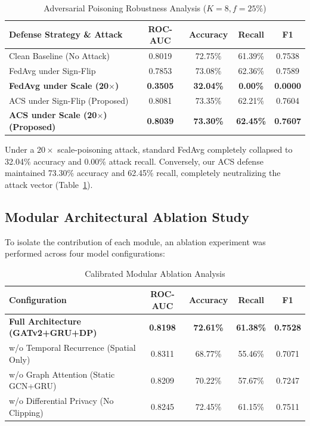 \documentclass[conference]{IEEEtran}
\begin{document}
\begin{table}[htbp]
\caption{Adversarial Poisoning Robustness Analysis ($K=8, f=25\%$)}
\label{tab:byzantine_defense}
\centering
\begin{tabular}{|l|c|c|c|c|}
\hline
\textbf{Defense Strategy \& Attack} & \textbf{ROC-AUC} & \textbf{Accuracy} & \textbf{Recall} & \textbf{F1} \\
\hline
Clean Baseline (No Attack) & 0.8019 & 72.75\% & 61.39\% & 0.7538 \\
FedAvg under Sign-Flip & 0.7853 & 73.08\% & 62.36\% & 0.7589 \\
\textbf{FedAvg under Scale (20$\times$)} & \textbf{0.3505} & \textbf{32.04\%} & \textbf{0.00\%} & \textbf{0.0000} \\
ACS under Sign-Flip (Proposed) & 0.8081 & 73.35\% & 62.21\% & 0.7604 \\
\textbf{ACS under Scale (20$\times$) (Proposed)} & \textbf{0.8039} & \textbf{73.30\%} & \textbf{62.45\%} & \textbf{0.7607} \\
\hline
\end{tabular}
\end{table}

Under a $20\times$ scale-poisoning attack, standard FedAvg completely collapsed to 32.04\% accuracy and 0.00\% attack recall. Conversely, our ACS defense maintained 73.30\% accuracy and 62.45\% recall, completely neutralizing the attack vector (Table~\ref{tab:byzantine_defense}).

\subsection{Modular Architectural Ablation Study}
To isolate the contribution of each module, an ablation experiment was performed across four model configurations:

\begin{table}[htbp]
\caption{Calibrated Modular Ablation Analysis}
\label{tab:ablation_analysis}
\centering
\begin{tabular}{|l|c|c|c|c|}
\hline
\textbf{Configuration} & \textbf{ROC-AUC} & \textbf{Accuracy} & \textbf{Recall} & \textbf{F1} \\
\hline
\textbf{Full Architecture (GATv2+GRU+DP)} & \textbf{0.8198} & \textbf{72.61\%} & \textbf{61.38\%} & \textbf{0.7528} \\
w/o Temporal Recurrence (Spatial Only) & 0.8311 & 68.77\% & 55.46\% & 0.7071 \\
w/o Graph Attention (Static GCN+GRU) & 0.8209 & 70.22\% & 57.67\% & 0.7247 \\
w/o Differential Privacy (No Clipping) & 0.8245 & 72.45\% & 61.15\% & 0.7511 \\
\hline
\end{tabular}
\end{table}
\end{document}
